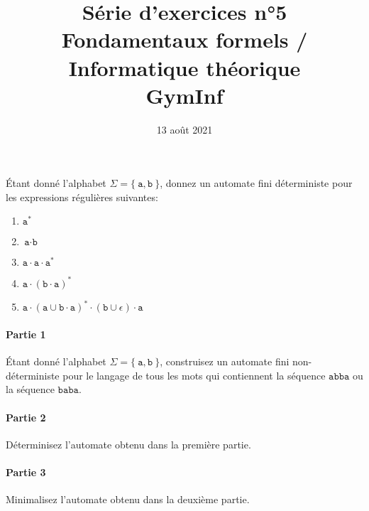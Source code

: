 \documentclass[12pt,french,a4paper]{article}
\begin{document}
\title{\vspace{-2cm}Série d'exercices n°5\\\large{Fondamentaux formels / Informatique théorique\\GymInf}}
\date{\vspace{-1cm}13 août 2021}

\maketitle

\begin{question}
Étant donné l'alphabet $\Sigma = \{\ \texttt{a}, \texttt{b}\ \}$, donnez un automate fini déterministe pour les expressions régulières suivantes:
\begin{enumerate}
\item $\texttt{a}^*$
\item $\texttt{a} \cdot \texttt{b}$
\item $\texttt{a} \cdot \texttt{a} \cdot \texttt{a}^*$
\item $\texttt{a} \cdot (\texttt{b} \cdot \texttt{a})^*$
\item $\texttt{a} \cdot (\texttt{a} \cup \texttt{b} \cdot \texttt{a})^* \cdot (\texttt{b} \cup \epsilon) \cdot \texttt{a}$
\end{enumerate}
\end{question}

\vspace{1cm}

\begin{question}
\paragraph{Partie 1}
Étant donné l'alphabet $\Sigma = \{\ \texttt{a}, \texttt{b}\ \}$, construisez un automate fini non-déterministe pour le langage de tous les mots qui contiennent la séquence $\texttt{abba}$ ou la séquence $\texttt{baba}$.

\paragraph{Partie 2}
Déterminisez l'automate obtenu dans la première partie.

\paragraph{Partie 3}
Minimalisez l'automate obtenu dans la deuxième partie.
\end{question}
\end{document}
